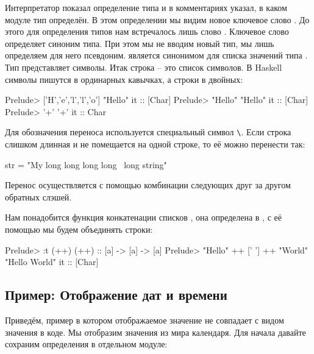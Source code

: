 Интерпретатор показал определение типа и в комментариях 
указал, в каком модуле тип определён. В этом определении мы
видим новое ключевое слово  . До этого для определения
типов нам встречалось лишь слово . 
Ключевое слово  определяет синоним типа. При этом
мы не вводим новый тип, мы лишь определяем для него псевдоним. 
 является синонимом для списка значений типа 
. Тип
 представляет символы. Итак строка -- это список символов.
В Haskell символы пишутся в ординарных кавычках, а строки
в двойных:


\begin{code}
Prelude> ['H','e','l','l','o']
"Hello"
it :: [Char]
Prelude> "Hello"
"Hello"
it :: [Char]
Prelude> '+'
'+'
it :: Char
\end{code}

Для обозначения переноса используется специальный символ 
\verb!\!.
Если строка слишком длинная и не помещается на одной строке,
то её можно перенести так:

\begin{code}
str = "My long long long long \
        \long long string"
\end{code}

Перенос осуществляется с помощью комбинации следующих
друг за другом обратных слэшей. 

Нам понадобится функция конкатенации списков \In{(++)},
она определена в , с её помощью мы будем объединять строки:

\begin{code}
Prelude> :t (++)
(++) :: [a] -> [a] -> [a]
Prelude> "Hello" ++ [' '] ++ "World"
"Hello World"
it :: [Char]
\end{code}


\subsection{Пример: Отображение дат и времени}

Приведём, пример в котором отображаемое значение не совпадает
с видом значения в коде. Мы отобразим значения из мира календаря.
Для начала давайте сохраним определения в отдельном модуле:

